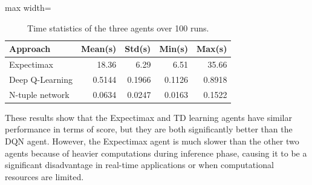 \documentclass[letterpaper]{article} %
\begin{document}
    \begin{table}[H]
        \centering
        \small
        \begin{adjustbox}{max width=\columnwidth}
        \begin{tabular}{l r r r r}
        \toprule
        \textbf{Approach} & \textbf{Mean(s)} & \textbf{Std(s)} & \textbf{Min(s)} & \textbf{Max(s)} \\
        \midrule
        Expectimax       & 18.36  & 6.29 & 6.51 & 35.66  \\
        Deep Q-Learning  & 0.5144 &  0.1966 & 0.1126 & 0.8918  \\
        N-tuple network  & 0.0634 &  0.0247 & 0.0163 & 0.1522 \\
        \bottomrule
        \end{tabular}
        \end{adjustbox}
        \caption{Time statistics of the three agents over 100 runs.}
        \label{tab:time_stats}
    \end{table}

    These results show that the Expectimax and TD learning agents have similar performance in terms of score, but they are both significantly better than the DQN agent.
    However, the Expectimax agent is much slower than the other two agents because of heavier computations during inference phase, causing it to be a significant disadvantage in real-time applications or when computational resources are limited.
\end{document}
